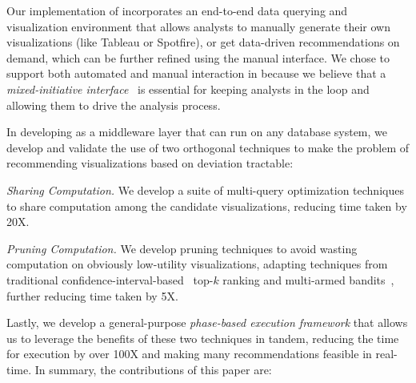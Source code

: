 Our implementation of \SeeDB incorporates an end-to-end data querying and 
visualization environment that allows analysts to manually generate 
their own visualizations (like Tableau or Spotfire), or get data-driven recommendations on demand, which
can be further refined using the manual interface.
We chose to support both automated and manual interaction in \SeeDB because we 
believe that a {\em mixed-initiative interface}~\cite{mixed_initiative} is essential for keeping 
analysts in the loop and allowing them to drive the analysis process.

In developing \SeeDB as a middleware layer that can run on any database system,
we develop and validate the use of  
two orthogonal techniques to make the problem of recommending visualizations based on deviation tractable:
\begin{denselist}
\item {\em Sharing Computation.} 
We develop a suite of multi-query optimization techniques to share computation
among the candidate visualizations,
reducing time taken by 20X.
\item {\em Pruning Computation.}
We develop pruning techniques to avoid wasting computation
on obviously low-utility visualizations, adapting
techniques from traditional 
  confidence-interval-based~\cite{hoeffding1963probability} 
  top-$k$ ranking and
  multi-armed bandits~\cite{bandits},
  further reducing time taken by 5X.
\end{denselist}
Lastly, we develop a general-purpose {\em phase-based execution framework}
that allows us to leverage the benefits of these two techniques
in tandem, reducing the time for execution by over 100X and
making many recommendations feasible in real-time.
In summary, the contributions of this paper are:


